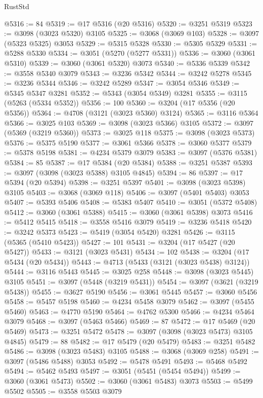 \begin{lexlean}{RustStd}
\begin{coremodule}
{\begin{coremodule}
{{{{{{{{{{{{{{{{{{{{{{{{{{{{{{{{@5316 := 84
@5319 := @17 @5316 (@20 @5316)
@5320 := @3251 @5319
@5323 := @3098 (@3023 @5320) @3105
@5325 := @3068 (@3069 @103)
@5328 := @3097 (@5323 @5325) @3053
@5329 := @5315 @5328
@5330 := @5305 @5329
@5331 := @5288 @5330
@5334 := @3051 (@5270 (@5277 @5331))
@5336 := @3060 (@3061 @5310)
@5339 := @3060 (@3061 @5320) @3073
@5340 := @5336 @5339
@5342 := @3558 @5340 @3079
@5343 := @3236 @5342
@5344 := @3242 @5278
@5345 := @3236 @5344
@5346 := @3242 @5289
@5347 := @3054 @5346
@5349 := @5345 @5347 @3281
@5352 := @5343 (@3054 @5349) @3281
@5355 := @3115 (@5263 (@5334 @5352))
@5356 := 100
@5360 := @3204 (@17 @5356 (@20 @5356))
@5364 := @4708 (@3121 (@3023 @5360) @3124)
@5365 := @3116 @5364
@5366 := @3025 @103
@5369 := @3098 (@3023 @5366) @3105
@5372 := @3097 (@5369 (@3219 @5360))
@5373 := @3025 @118
@5375 := @3098 (@3023 @5373)
@5376 := @5375 @5190
@5377 := @3061 @5366
@5378 := @3060 @5377
@5379 := @5378 @5198
@5381 := @4234 @5379 @3079
@5383 := @3097 (@5376 @5381)
@5384 := 85
@5387 := @17 @5384 (@20 @5384)
@5388 := @3251 @5387
@5393 := @3097 (@3098 (@3023 @5388) @3105 @4845)
@5394 := 86
@5397 := @17 @5394 (@20 @5394)
@5398 := @3251 @5397
@5401 := @3098 (@3023 @5398) @3105
@5403 := @3068 (@3069 @118)
@5406 := @3097 (@5401 @5403) @3053
@5407 := @5393 @5406
@5408 := @5383 @5407
@5410 := @3051 (@5372 @5408)
@5412 := @3060 (@3061 @5388)
@5415 := @3060 (@3061 @5398) @3073
@5416 := @5412 @5415
@5418 := @3558 @5416 @3079
@5419 := @3236 @5418
@5420 := @3242 @5373
@5423 := @5419 (@3054 @5420) @3281
@5426 := @3115 (@5365 (@5410 @5423))
@5427 := 101
@5431 := @3204 (@17 @5427 (@20 @5427))
@5433 := @3121 (@3023 @5431)
@5434 := 102
@5438 := @3204 (@17 @5434 (@20 @5434))
@5443 := @4713 (@5433 (@3121 (@3023 @5438) @3124))
@5444 := @3116 @5443
@5445 := @3025 @258
@5448 := @3098 (@3023 @5445) @3105
@5451 := @3097 (@5448 (@3219 @5431))
@5454 := @3097 (@3621 (@3219 @5438))
@5455 := @3627 @5190
@5456 := @3061 @5445
@5457 := @3060 @5456
@5458 := @5457 @5198
@5460 := @4234 @5458 @3079
@5462 := @3097 (@5455 @5460)
@5463 := @4770 @5190
@5464 := @4762 @5300
@5466 := @4234 @5464 @3079
@5468 := @3097 (@5463 @5466)
@5469 := 87
@5472 := @17 @5469 (@20 @5469)
@5473 := @3251 @5472
@5478 := @3097 (@3098 (@3023 @5473) @3105 @4845)
@5479 := 88
@5482 := @17 @5479 (@20 @5479)
@5483 := @3251 @5482
@5486 := @3098 (@3023 @5483) @3105
@5488 := @3068 (@3069 @258)
@5491 := @3097 (@5486 @5488) @3053
@5492 := @5478 @5491
@5493 := @5468 @5492
@5494 := @5462 @5493
@5497 := @3051 (@5451 (@5454 @5494))
@5499 := @3060 (@3061 @5473)
@5502 := @3060 (@3061 @5483) @3073
@5503 := @5499 @5502
@5505 := @3558 @5503 @3079
}}}}}}}}}}}}}}}}}}}}}}}}}}}}}}}}
\end{coremodule}}
\end{coremodule}
\end{lexlean}
